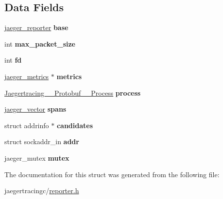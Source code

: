 \subsection*{Data Fields}
\begin{DoxyCompactItemize}
\item 
\mbox{\label{structjaeger__remote__reporter_a89bd53b42a0b16a2e5bfa9a95d3b5e16}} 
\mbox{\hyperlink{structjaeger__reporter}{jaeger\+\_\+reporter}} {\bfseries base}
\item 
\mbox{\label{structjaeger__remote__reporter_a4b27982db06432b478b409878547bb5f}} 
int {\bfseries max\+\_\+packet\+\_\+size}
\item 
\mbox{\label{structjaeger__remote__reporter_a6fcfeba0f020bd1f00135431e352b2d7}} 
int {\bfseries fd}
\item 
\mbox{\label{structjaeger__remote__reporter_a8867921360be00bffacc7a930c5ee58d}} 
\mbox{\hyperlink{structjaeger__metrics}{jaeger\+\_\+metrics}} $\ast$ {\bfseries metrics}
\item 
\mbox{\label{structjaeger__remote__reporter_a9d5abfaa9dd79e6dc0fcffc7d56c5dd0}} 
\mbox{\hyperlink{struct__Jaegertracing____Protobuf____Process}{Jaegertracing\+\_\+\+\_\+\+Protobuf\+\_\+\+\_\+\+Process}} {\bfseries process}
\item 
\mbox{\label{structjaeger__remote__reporter_a74c3e087c47a8f87b69ff599ec700bde}} 
\mbox{\hyperlink{structjaeger__vector}{jaeger\+\_\+vector}} {\bfseries spans}
\item 
\mbox{\label{structjaeger__remote__reporter_af1d5e71f259ba8abc6ebae895b7f072a}} 
struct addrinfo $\ast$ {\bfseries candidates}
\item 
\mbox{\label{structjaeger__remote__reporter_a43710b8f44d84500a9df68002c4b3a9e}} 
struct sockaddr\+\_\+in {\bfseries addr}
\item 
\mbox{\label{structjaeger__remote__reporter_a8087ff64ca9e393c1e4054e2b9eb275c}} 
jaeger\+\_\+mutex {\bfseries mutex}
\end{DoxyCompactItemize}


The documentation for this struct was generated from the following file\+:\begin{DoxyCompactItemize}
\item 
jaegertracingc/\mbox{\hyperlink{reporter_8h}{reporter.\+h}}\end{DoxyCompactItemize}
